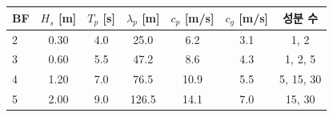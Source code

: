 
\begin{tabular}{lcccccc}
\toprule
BF & $H_s$ [m] & $T_p$ [s] & $\lambda_p$ [m] & $c_p$ [m/s] & $c_g$ [m/s] & 성분 수 \\
\midrule
2 & 0.30 & 4.0 & 25.0 & 6.2 & 3.1 & 1, 2 \\
3 & 0.60 & 5.5 & 47.2 & 8.6 & 4.3 & 1, 2, 5 \\
4 & 1.20 & 7.0 & 76.5 & 10.9 & 5.5 & 5, 15, 30 \\
5 & 2.00 & 9.0 & 126.5 & 14.1 & 7.0 & 15, 30 \\
\bottomrule
\end{tabular}
